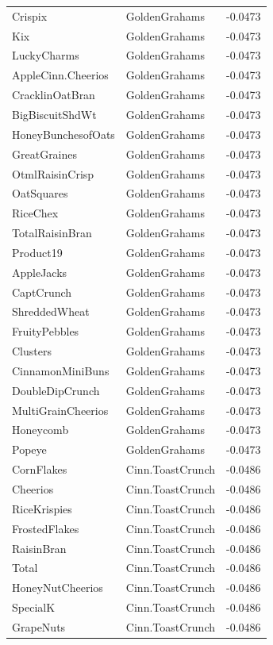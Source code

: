 \begin{longtable}{llr}
Crispix & GoldenGrahams & -0.0473 \\
Kix & GoldenGrahams & -0.0473 \\
LuckyCharms & GoldenGrahams & -0.0473 \\
AppleCinn.Cheerios & GoldenGrahams & -0.0473 \\
CracklinOatBran & GoldenGrahams & -0.0473 \\
BigBiscuitShdWt & GoldenGrahams & -0.0473 \\
HoneyBunchesofOats & GoldenGrahams & -0.0473 \\
GreatGraines & GoldenGrahams & -0.0473 \\
OtmlRaisinCrisp & GoldenGrahams & -0.0473 \\
OatSquares & GoldenGrahams & -0.0473 \\
RiceChex & GoldenGrahams & -0.0473 \\
TotalRaisinBran & GoldenGrahams & -0.0473 \\
Product19 & GoldenGrahams & -0.0473 \\
AppleJacks & GoldenGrahams & -0.0473 \\
CaptCrunch & GoldenGrahams & -0.0473 \\
ShreddedWheat & GoldenGrahams & -0.0473 \\
FruityPebbles & GoldenGrahams & -0.0473 \\
Clusters & GoldenGrahams & -0.0473 \\
CinnamonMiniBuns & GoldenGrahams & -0.0473 \\
DoubleDipCrunch & GoldenGrahams & -0.0473 \\
MultiGrainCheerios & GoldenGrahams & -0.0473 \\
Honeycomb & GoldenGrahams & -0.0473 \\
Popeye & GoldenGrahams & -0.0473 \\
CornFlakes & Cinn.ToastCrunch & -0.0486 \\
Cheerios & Cinn.ToastCrunch & -0.0486 \\
RiceKrispies & Cinn.ToastCrunch & -0.0486 \\
FrostedFlakes & Cinn.ToastCrunch & -0.0486 \\
RaisinBran & Cinn.ToastCrunch & -0.0486 \\
Total & Cinn.ToastCrunch & -0.0486 \\
HoneyNutCheerios & Cinn.ToastCrunch & -0.0486 \\
SpecialK & Cinn.ToastCrunch & -0.0486 \\
GrapeNuts & Cinn.ToastCrunch & -0.0486 \\

\end{longtable}
